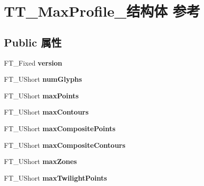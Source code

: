\hypertarget{struct_t_t___max_profile__}{}\section{T\+T\+\_\+\+Max\+Profile\+\_\+结构体 参考}
\label{struct_t_t___max_profile__}
\subsection*{Public 属性}
\begin{DoxyCompactItemize}
\item 
\mbox{\label{struct_t_t___max_profile___a59618f7c572dadc58e883d32dea46380}} 
F\+T\+\_\+\+Fixed {\bfseries version}
\item 
\mbox{\label{struct_t_t___max_profile___a6ec14b34978f24173d50ab556613ade5}} 
F\+T\+\_\+\+U\+Short {\bfseries num\+Glyphs}
\item 
\mbox{\label{struct_t_t___max_profile___a218fa149a195e9afa1738ef5aef07aa1}} 
F\+T\+\_\+\+U\+Short {\bfseries max\+Points}
\item 
\mbox{\label{struct_t_t___max_profile___a5af98bd8149008d0a33b61d9730262a9}} 
F\+T\+\_\+\+U\+Short {\bfseries max\+Contours}
\item 
\mbox{\label{struct_t_t___max_profile___aafc5ef3f58254792c353a6fb3b3a044e}} 
F\+T\+\_\+\+U\+Short {\bfseries max\+Composite\+Points}
\item 
\mbox{\label{struct_t_t___max_profile___a956e7c44e46a8aeb6d419b8550d1e556}} 
F\+T\+\_\+\+U\+Short {\bfseries max\+Composite\+Contours}
\item 
\mbox{\label{struct_t_t___max_profile___a07213312ec7b821a53a17d90930a478a}} 
F\+T\+\_\+\+U\+Short {\bfseries max\+Zones}
\item 
\mbox{\label{struct_t_t___max_profile___a907e28d69ad5e2a2c446e3eae8301af2}} 
F\+T\+\_\+\+U\+Short {\bfseries max\+Twilight\+Points}
\item 

\end{DoxyCompactItemize}
